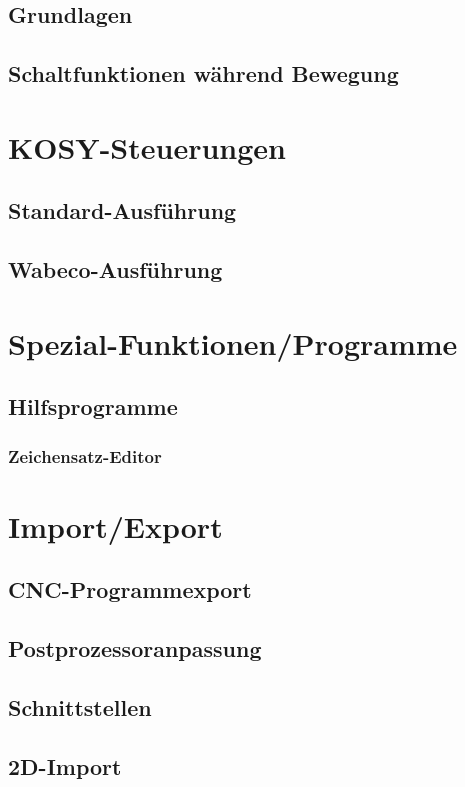 \documentclass[14pt,a4paper]{book}
\begin{document}
	\section{Grundlagen} 
	\section{Schaltfunktionen während Bewegung} 
 
\chapter{KOSY-Steuerungen} 
	\section{Standard-Ausführung} 
	\section{Wabeco-Ausführung} 

\chapter{Spezial-Funktionen/Programme} 
	\section{Hilfsprogramme} 
		\subsection{Zeichensatz-Editor} 

\chapter{Import/Export} 
	\section{CNC-Programmexport} 
	\section{Postprozessoranpassung} 
	\section{Schnittstellen} 
	\section{2D-Import} 
\end{document}
